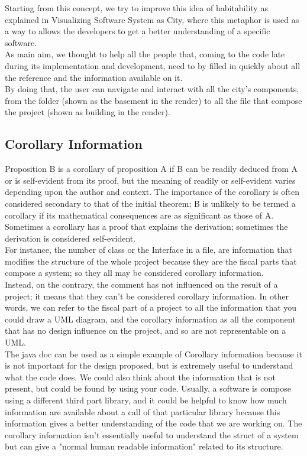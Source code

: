 \documentclass[]{usiinfbachelorproject}
\begin{document}
Starting from this concept, we try to improve this idea of habitability as explained in \cite{vssac} Visualizing Software System as City, where this metaphor is used as a way to allows the developers to get a better understanding of a specific software. \\
As main aim, we thought to help all the people that, coming to the code late during its implementation and development, need to by filled in quickly about all the reference and the information available on it.\\
By doing that, the user can navigate and interact with all the city's components, from the folder (shown as the basement in the render) to all the file that compose the project (shown as building in the render). 


\subsection{Corollary Information} 
Proposition B is a corollary of proposition A if B can be readily deduced from A or is self-evident from its proof, but the meaning of readily or self-evident varies depending upon the author and context. The importance of the corollary is often considered secondary to that of the initial theorem; B is unlikely to be termed a corollary if its mathematical consequences are as significant as those of A. Sometimes a corollary has a proof that explains the derivation; sometimes the derivation is considered self-evident. \cite{wikiCory}\\

For instance, the number of class or the Interface in a file, are information that modifies the structure of the whole project because they are the fiscal parts that compose a system; so they all may be considered corollary information. \\
Instead, on the contrary, the comment has not influenced on the result of a project; it means that they can't be considered corollary information. 
In other words, we can refer to the fiscal part of a project to all the information that you could draw a UML diagram, and the corollary information as all the component that has no design influence on the project, and so are not representable on a UML.\\
The java doc can be used as a simple example of Corollary information  because it is not important for the design proposed, but is extremely useful to understand what the code does. We could also think about the information that is not present, but could be found by using your code. Usually, a software is compose using a different third part library, and it could be helpful to know how much information are available about a call of that particular library because this information gives a better understanding of the code that we are working on. 
The corollary information isn't essentially useful to understand the struct of a system but can give a "normal human readable information" related to its structure.
\end{document}
